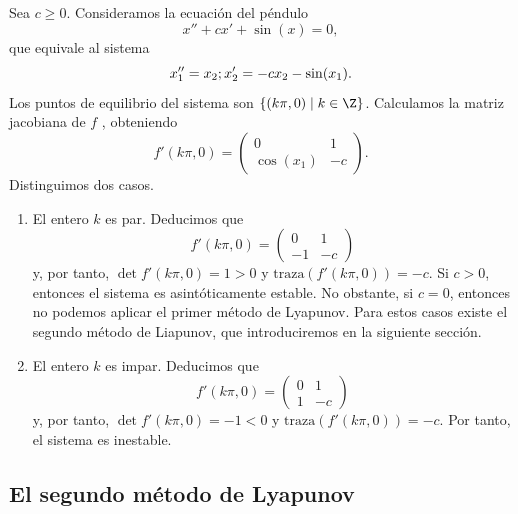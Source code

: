 \begin{ex}
  Sea $c \ge 0$. Consideramos la ecuación del péndulo
  \begin{equation}
    \label{eq:pendulo:estabilidad}
    x'' + cx' + \sin(x) = 0,
  \end{equation}
  que equivale al sistema
  \begin{equation}
    \label{eq:pendulo:estabilidad:2}
    x_1'' = x_2; \\
    x_2' = - c x_2 - \sin(x_1).
  \end{equation}
  Los puntos de equilibrio del sistema son $\{(k \pi , 0) \mid k \in \Z\}$. Calculamos la matriz
  jacobiana de $f$ , obteniendo
  \[ f'(k\pi, 0) = \left(
      \begin{matrix}
        0 & 1 \\
        \cos(x_1) & -c
      \end{matrix}
    \right). \] Distinguimos dos casos.
  
  \begin{enumerate}
  \item El entero $k$ es par. Deducimos que
    \[ f'(k\pi, 0) = \left(
        \begin{matrix}
          0 & 1 \\
          -1 & -c
        \end{matrix}
      \right) \] y, por tanto, $\det f'(k \pi, 0) = 1 > 0$ y $\mathrm{traza}(f'(k\pi,0)) = -c$. Si
    $c > 0$, entonces el sistema es asintóticamente estable. No obstante, si $c=0$, entonces no
    podemos aplicar el primer método de Lyapunov. Para estos casos existe el segundo método de
    Liapunov, que introduciremos en la siguiente sección.
  \item El entero $k$ es impar. Deducimos que
    \[ f'(k\pi, 0) = \left(
        \begin{matrix}
          0 & 1 \\
          1 & -c
        \end{matrix}
      \right) \] y, por tanto, $\det f'(k \pi, 0) = -1 < 0$ y $\mathrm{traza}(f'(k\pi,0)) = -c$. Por
    tanto, el sistema es inestable. \qedhere
  \end{enumerate}
\end{ex}


\subsection{El segundo método de Lyapunov}

